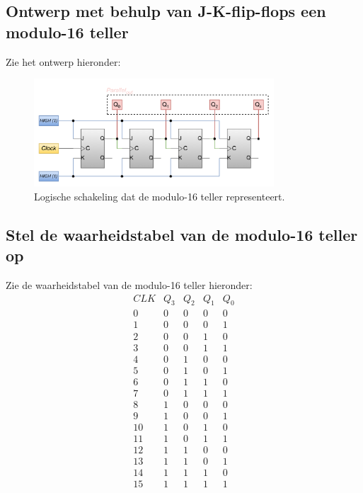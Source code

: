 \documentclass[12pt]{article}
\begin{document}
\subsection{Ontwerp met behulp van J-K-flip-flops een modulo-16 teller}
Zie het ontwerp hieronder:
\begin{figure}[h]
    \centering
    \includegraphics[width=0.8\textwidth]{16mod.png}
    \caption{Logische schakeling dat de modulo-16 teller representeert.}
    \label{fig:16mod}
\end{figure}
\subsection{Stel de waarheidstabel van de modulo-16 teller op}
\label{lol1}
Zie de waarheidstabel van de modulo-16 teller hieronder:
\begin{displaymath}
    \begin{array}{|c||c|c|c|c|}
    CLK & Q_3 & Q_2 & Q_1 & Q_0 \\
    \hline 
    0 & 0 & 0 & 0 & 0 \\
    1 & 0 & 0 & 0 & 1 \\
    2 & 0 & 0 & 1 & 0 \\
    3 & 0 & 0 & 1 & 1 \\
    4 & 0 & 1 & 0 & 0 \\
    5 & 0 & 1 & 0 & 1 \\
    6 & 0 & 1 & 1 & 0 \\
    7 & 0 & 1 & 1 & 1 \\
    8 & 1 & 0 & 0 & 0 \\
    9 & 1 & 0 & 0 & 1 \\
    10 & 1 & 0 & 1 & 0 \\
    11 & 1 & 0 & 1 & 1 \\
    12 & 1 & 1 & 0 & 0 \\
    13 & 1 & 1 & 0 & 1 \\
    14 & 1 & 1 & 1 & 0 \\
    15 & 1 & 1 & 1 & 1 
  \end{array}
    \end{displaymath}
    \pagebreak
\end{document}
